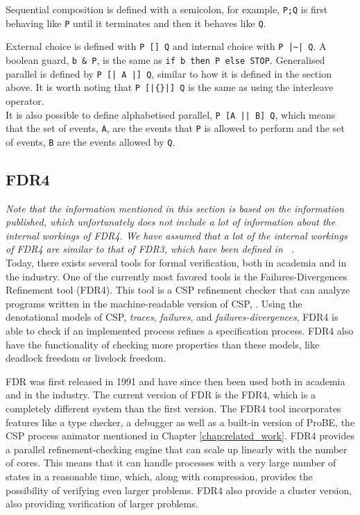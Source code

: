 Sequential composition is defined with a semicolon, for example, \texttt{P;Q} is first behaving like \texttt{P} until it terminates and then it behaves like \texttt{Q}.

External choice is defined with \texttt{P [] Q} and internal choice with \texttt{P |\textasciitilde| Q}. A boolean guard, \texttt{b \& P}, is the same as \texttt{if b then P else STOP}.
Generalised parallel is defined by \texttt{P [| A |] Q}, similar to how it is defined in the section above. It is worth noting that \texttt{P [|\{\}|] Q} is the same as using the interleave operator. \\
It is also possible to define alphabetised parallel, \texttt{P [A || B] Q}, which means that the set of events, \texttt{A}, are the events that \texttt{P} is allowed to perform and the set of events, \texttt{B} are the events allowed by \texttt{Q}.
%

\subsection{FDR4}
\textit{Note that the information mentioned in this section is based on the information published, which unfortunately does not include a lot of information about the internal workings of FDR4. We have assumed that a lot of the internal workings of FDR4 are similar to that of FDR3, which have been defined in ~\cite{fdr}.}\\

Today, there exists several tools for formal verification, both in academia and in the industry. One of the currently most favored tools is the Failures-Divergences Refinement tool (FDR4). This tool is a CSP refinement checker that can analyze programs written in the machine-readable version of CSP, \cspm{}. Using the denotational models of CSP, \textit{traces}, \textit{failures}, and \textit{failures-divergences}, FDR4 is able to check if an implemented process refines a specification process. FDR4 also have the functionality of checking more properties than these models, like deadlock freedom or livelock freedom.

FDR was first released in 1991 and have since then been used both in academia and in the industry. The current version of FDR is the FDR4, which is a completely different system than the first version.
The FDR4 tool incorporates features like a \cspm{} type checker, a debugger as well as a built-in version of ProBE, the CSP process animator mentioned in Chapter \ref{chap:related_work}. FDR4 provides a parallel refinement-checking engine that can scale up linearly with the number of cores. This means that it can handle processes with a very large number of states in a reasonable time, which, along with compression, provides the possibility of verifying even larger problems. FDR4 also provide a cluster version, also providing verification of larger problems.\\


